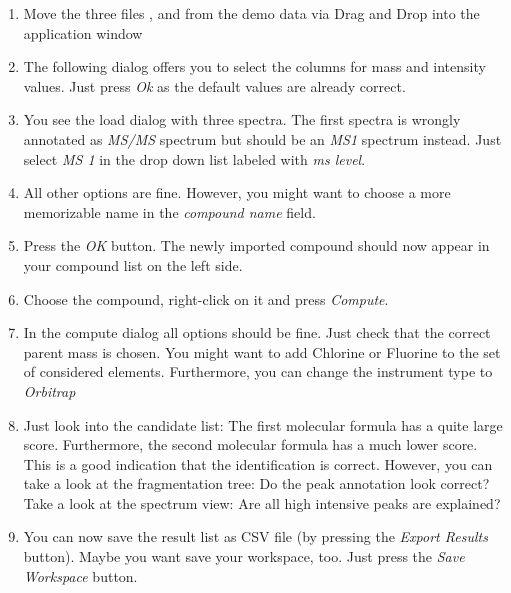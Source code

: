 \documentclass[letterpaper,10pt,openany,oneside]{sphinxmanual}
\newcommand\gui[1]{\textsl{\guilsinglleft#1\guilsinglright\xspace}}
\begin{document}
\begin{enumerate}
	\item {} 
	Move the three files ,  and  from the demo data via Drag and Drop into the application window
	
	\item {} 
	The following dialog offers you to select the columns for mass and intensity values. Just press \gui{Ok} as the default values are already correct.
	
	\item {} 
	You see the load dialog with three spectra. The first spectra is wrongly
	annotated as \emph{MS/MS} spectrum but should be an \emph{MS1} spectrum
	instead. Just select \gui{MS 1} in the drop down list labeled with \gui{ms
		level}.
	
	\item {} 
	All other options are fine. However, you might want to choose a more memorizable name in the \gui{compound name} field.
	
	\item {} 
	Press the \gui{OK} button. The newly imported compound should now appear in your compound list on the left side.
	
	\item {} 
	Choose the compound, right-click on it and press \gui{Compute}.
	
	\item {} 
	In the compute dialog all options should be fine. Just check that the correct parent mass is chosen. You might want to add Chlorine or Fluorine to the set of considered elements. Furthermore, you can change the instrument type to \gui{Orbitrap}
	
	\item {} 
	Just look into the candidate list: The first molecular formula has a quite large score. Furthermore, the second molecular formula has a much lower score. This is a good indication that the identification is correct. However, you can take a look at the fragmentation tree: Do the peak annotation look correct? Take a look at the spectrum view: Are all high intensive peaks are explained?
	
	\item {} 
	You can now save the result list as CSV file (by pressing the \gui{Export Results} button). Maybe you want save your workspace, too. Just press the \gui{Save Workspace} button.
	
\end{enumerate}
\end{document}
